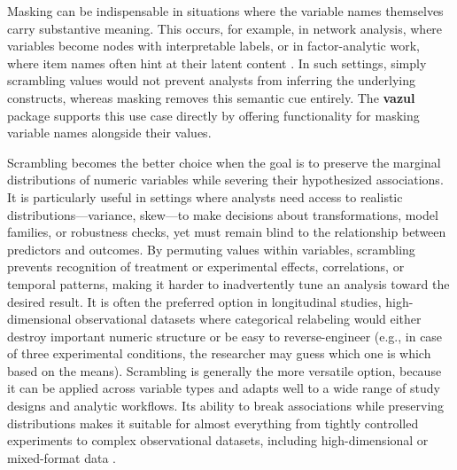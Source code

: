 Masking can be indispensable in situations where the variable names themselves carry substantive meaning. This occurs, for example, in network analysis, where variables become nodes with interpretable labels, or in factor-analytic work, where item names often hint at their latent content \citep{Hoekstra2025-ub}. In such settings, simply scrambling values would not prevent analysts from inferring the underlying constructs, whereas masking removes this semantic cue entirely. The \textbf{vazul} package supports this use case directly by offering functionality for masking variable names alongside their values.

Scrambling becomes the better choice when the goal is to preserve the marginal distributions of numeric variables while severing their hypothesized associations. It is particularly useful in settings where analysts need access to realistic distributions---variance, skew---to make decisions about transformations, model families, or robustness checks, yet must remain blind to the relationship between predictors and outcomes. By permuting values within variables, scrambling prevents recognition of treatment or experimental effects, correlations, or temporal patterns, making it harder to inadvertently tune an analysis toward the desired result. It is often the preferred option in longitudinal studies, high-dimensional observational datasets where categorical relabeling would either destroy important numeric structure or be easy to reverse-engineer (e.g., in case of three experimental conditions, the researcher may guess which one is which based on the means). Scrambling is generally the more versatile option, because it can be applied across variable types and adapts well to a wide range of study designs and analytic workflows. Its ability to break associations while preserving distributions makes it suitable for almost everything from tightly controlled experiments to complex observational datasets, including high-dimensional or mixed-format data \citep{Sarafoglou2025-fr, Sarafoglou2023-rf}.

